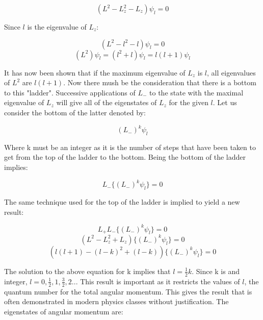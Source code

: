\documentclass{article}
\begin{document}
\begin{equation}
(L^2 - L_z^2 - L_z)\psi_{l} = 0 
\end{equation}

Since $l$ is the eigenvalue of $L_z$:

\begin{equation}
(L^2 - l^2 - l)\psi_{l} = 0 
\end{equation}
\begin{equation}
(L^2)\psi_{l} = (l^2 + l)\psi_{l} = l(l + 1)\psi_{l}
\end{equation}

It has now been shown that if the maximum eigenvalue of $L_z$ is $l$, all eigenvalues of $L^2$ are $l(l + 1)$. Now there mush be the consideration that there is a bottom to this "ladder". Successive applications of $L_-$ to the state with the maximal eigenvalue of $L_z$ will give all of the eigenstates of $L_z$ for the given $l$. Let us consider the bottom of the latter denoted by:

\begin{equation}
(L_-)^k\psi_{l} 
\end{equation}

Where k must be an integer as it is the number of steps that have been taken to get from the top of the ladder to the bottom. Being the bottom of the ladder implies:

\begin{equation}
L_-\{(L_-)^k\psi_{l}\}  = 0 
\end{equation}

The same technique used for the top of the ladder is implied to yield a new result:

\begin{equation}
L_+L_-\{(L_-)^k\psi_{l}\}  = 0 
\end{equation}
\begin{equation}
(L^2 - L_z^2 + L_z)\{(L_-)^k\psi_{l}\}  = 0 
\end{equation}
\begin{equation}
(l(l + 1) - (l - k)^2 + (l - k))\{(L_-)^k\psi_{l}\} = 0 
\end{equation}

The solution to the above equation for k implies that $l = \frac{1}{2}k$. Since k is and integer, $l = 0, \frac{1}{2}, 1, \frac{3}{2}, 2...$ This result is important as it restricts the values of $l$, the quantum number for the total angular momentum. This gives the result that is often demonstrated in modern physics classes without justification. The eigenstates of angular momentum are:
\end{document}
